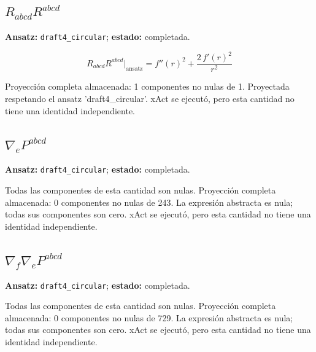 \documentclass[11pt]{article}
\begin{document}
\subsection*{$ R_{abcd}R^{abcd} $}
\textbf{Ansatz:} \texttt{draft4\_circular}; \textbf{estado:} completada.\par
\begin{dmath*}[breakdepth={5}]
R_{abcd}R^{abcd}\big|_{\mathrm{ansatz}} = {f''\!\left(r\right)}^{2} + \frac{2\,{f'\!\left(r\right)}^{2}}{{r}^{2}}
\end{dmath*}
\par\smallskip
Proyección completa almacenada: 1 componentes no nulas de 1. Proyectada respetando el ansatz 'draft4\_circular'. xAct se ejecutó, pero esta cantidad no tiene una identidad independiente.\par\medskip
{}
\subsection*{$ \nabla_e P^{abcd} $}
\textbf{Ansatz:} \texttt{draft4\_circular}; \textbf{estado:} completada.\par
Todas las componentes de esta cantidad son nulas.
Proyección completa almacenada: 0 componentes no nulas de 243. La expresión abstracta es nula; todas sus componentes son cero. xAct se ejecutó, pero esta cantidad no tiene una identidad independiente.\par\medskip
{}
\subsection*{$ \nabla_f\nabla_e P^{abcd} $}
\textbf{Ansatz:} \texttt{draft4\_circular}; \textbf{estado:} completada.\par
Todas las componentes de esta cantidad son nulas.
Proyección completa almacenada: 0 componentes no nulas de 729. La expresión abstracta es nula; todas sus componentes son cero. xAct se ejecutó, pero esta cantidad no tiene una identidad independiente.\par\medskip
\end{document}

